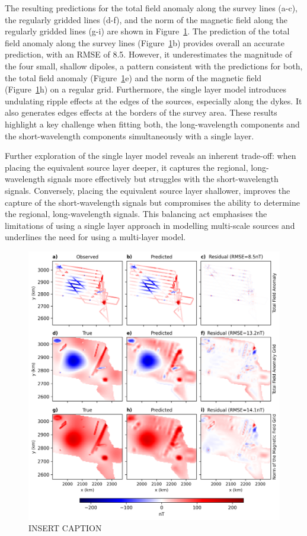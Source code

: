 The resulting predictions for the total field anomaly along the survey lines (a-c), the regularly gridded lines (d-f), and the norm of the magnetic field along the regularly gridded lines (g-i) are shown in Figure~\ref{fig:single_layer_synthetic}. The prediction of the total field anomaly along the survey lines (Figure~\ref{fig:single_layer_synthetic}b) provides overall an accurate prediction, with an RMSE of 8.5. However, it underestimates the magnitude of the four small, shallow dipoles, a pattern consistent with the predictions for both, the total field anomaly (Figure~\ref{fig:single_layer_synthetic}e) and the norm of the magnetic field (Figure~\ref{fig:single_layer_synthetic}h) on a regular grid. Furthermore, the single layer model introduces undulating ripple effects at the edges of the sources, especially along the dykes. It also generates edges effects at the borders of the survey area. These results highlight a key challenge when fitting both, the long-wavelength components and the short-wavelength components simultaneously with a single layer.

Further exploration of the single layer model reveals an inherent trade-off: when placing the equivalent source layer deeper, it captures the regional, long-wavelength signals more effectively but struggles with the short-wavelength signals. Conversely, placing the equivalent source layer shallower, improves the capture of the short-wavelength signals but compromises the ability to determine the regional, long-wavelength signals. This balancing act emphasises the limitations of using a single layer approach in modelling multi-scale sources and underlines the need for using a multi-layer model.
\clearpage

\begin{figure}[!h]
\centering
\includegraphics[width=1\linewidth]{figures/single_layer_synthetic.png}
\caption{
    INSERT CAPTION
}
\label{fig:single_layer_synthetic}
\end{figure}

